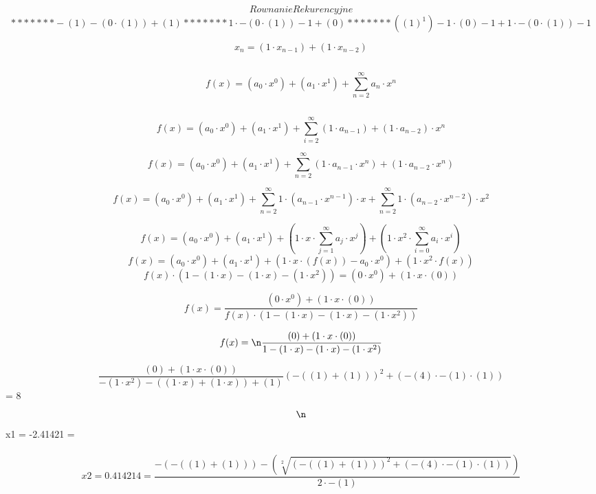 \documentclass[12pt]{article}
\begin{document}
 
 
 $$  Rownanie  Rekurencyjne  $$ $$ *******-(1)-(0\cdot(1))+(1)*******1\cdot-(0\cdot(1))-1+(0)*******((1)^{1})-1\cdot(0)-1+1\cdot-(0\cdot(1))-1$$ 
  
 
  $$   {{x}}_{{n}} = (1\cdot{{x}}_{{n-1}})+(1\cdot{{x}}_{{n-2}})$$ 
  
 
  $$ $$ 
 
 
 $$f(x) = ({{a}}_{0}\cdot{x}^{0})+({{a}}_{1}\cdot{x}^{1})+\sum_{{n} = {2}}^{{\infty}}{{a}}_{{n}}\cdot{x}^{n}$$ 
  
 
  $$    $$ 
  
 
  $$   f(x) = ({{a}}_{0}\cdot{x}^{0})+({{a}}_{1}\cdot{x}^{1})+\sum_{{i} = {2}}^{{\infty}}(1\cdot{{a}}_{{n-1}})+(1\cdot{{a}}_{{n-2}})\cdot{x}^{n}$$ 
 
 
 $$ f(x) = ({{a}}_{0}\cdot{x}^{0})+({{a}}_{1}\cdot{x}^{1})+\sum_{{n} = {2}}^{{\infty}}(1\cdot{{a}}_{{n-1}}\cdot{x}^{n})+(1\cdot{{a}}_{{n-2}}\cdot{x}^{n})$$ 
  
 
  $$    f(x) = ({{a}}_{0}\cdot{x}^{0})+({{a}}_{1}\cdot{x}^{1})+\sum_{{n} = {2}}^{{\infty}}1\cdot({{a}}_{{n-1}}\cdot{x}^{n-1})\cdot{x}+\sum_{{n} = {2}}^{{\infty}}1\cdot({{a}}_{{n-2}}\cdot{x}^{n-2})\cdot{x}^{2} $$
 
 
 $$		f(x) = ({{a}}_{0}\cdot{x}^{0})+({{a}}_{1}\cdot{x}^{1})+(1\cdot{x}\cdot\sum_{{j} = {1}}^{{\infty}}{{a}}_{{j}}\cdot{x}^{j})+(1\cdot{x}^{2}\cdot\sum_{{i} = {0}}^{{\infty}}{{a}}_{{i}}\cdot{x}^{i }) $$
  $$		$$ 
 $$  f(x) = ({{a}}_{0}\cdot{x}^{0})+({{a}}_{1}\cdot{x}^{1})+(1\cdot{x}\cdot({f(x)})-{{a}}_{{0}}\cdot{x}^{0})+(1\cdot{x}^{2}\cdot{f(x)})$$ 
   $$  $$ 
 $$  $$ 
 $$  {f(x)}\cdot({1}-(1\cdot{x})-(1\cdot{x})-(1\cdot{x}^{2})) = (0\cdot{x}^{0})+(1\cdot{x}\cdot(0))$$ 
  
 
  $$ f(x) =    \frac{(0\cdot{x}^{0})+(1\cdot{x}\cdot(0))}{{f(x)}\cdot({1}-(1\cdot{x})-(1\cdot{x})-(1\cdot{x}^{2}))}$$
  
 
 
    $$  f(x) =  \n\frac{(0)+(1\cdot{x}\cdot(0))}{{1}-(1\cdot{x})-(1\cdot{x})-(1\cdot{x}^{2})}  $$ 
 
  $$   \frac{(0)+(1\cdot{x}\cdot(0))}{-(1\cdot{x}^{2})-((1\cdot{x})+(1\cdot{x}))+(1)}(-((1)+(1)))^{2}+(-(4)\cdot-(1)\cdot(1)) $$ \n \n  \Delta = 8 $$ $$  \n \n  $$ $$   $$\n  \\ $$            x1  = -2.41421 =  $$ $$   $$   $$\n  \\ $$  x2 =  0.414214  =  \frac{-(-((1)+(1)))-(\sqrt[2]{{(-((1)+(1)))^{2}+(-(4)\cdot-(1)\cdot(1))}})}{2\cdot-(1)}   $$ $$   $$ 
 
\end{document}
